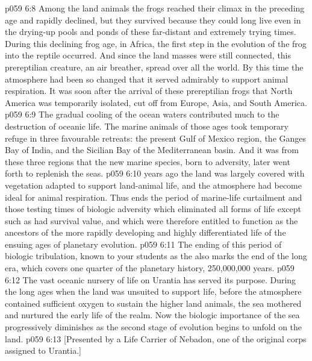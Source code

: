 \vs p059 6:8 \pc Among the land animals the frogs reached their climax in the preceding age and rapidly declined, but they survived because they could long live even in the drying\hyp{}up pools and ponds of these far\hyp{}distant and extremely trying times. During this declining frog age, in Africa, the first step in the evolution of the frog into the reptile occurred. And since the land masses were still connected, this prereptilian creature, an air breather, spread over all the world. By this time the atmosphere had been so changed that it served admirably to support animal respiration. It was soon after the arrival of these prereptilian frogs that North America was temporarily isolated, cut off from Europe, Asia, and South America.
\vs p059 6:9 The gradual cooling of the ocean waters contributed much to the destruction of oceanic life. The marine animals of those ages took temporary refuge in three favourable retreats: the present Gulf of Mexico region, the Ganges Bay of India, and the Sicilian Bay of the Mediterranean basin. And it was from these three regions that the new marine species, born to adversity, later went forth to replenish the seas.
\vs p059 6:10 \pc {} years ago the land was largely covered with vegetation adapted to support land\hyp{}animal life, and the atmosphere had become ideal for animal respiration. Thus ends the period of marine\hyp{}life curtailment and those testing times of biologic adversity which eliminated all forms of life except such as had survival value, and which were therefore entitled to function as the ancestors of the more rapidly developing and highly differentiated life of the ensuing ages of planetary evolution.
\vs p059 6:11 The ending of this period of biologic tribulation, known to your students as the  also marks the end of the long  era, which covers one quarter of the planetary history, 250,000,000 years.
\vs p059 6:12 The vast oceanic nursery of life on Urantia has served its purpose. During the long ages when the land was unsuited to support life, before the atmosphere contained sufficient oxygen to sustain the higher land animals, the sea mothered and nurtured the early life of the realm. Now the biologic importance of the sea progressively diminishes as the second stage of evolution begins to unfold on the land.
\vsetoff
\vs p059 6:13 [Presented by a Life Carrier of Nebadon, one of the original corps assigned to Urantia.]
\quizlink
